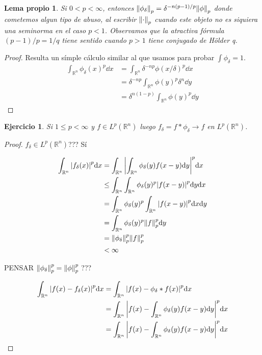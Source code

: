 \documentclass{article}
\newcommand{\realNumbers}{\mathbb{R}}
\newtheorem{exercise}{Ejercicio}
\newtheorem{myLemma}{Lema propio}
\theoremstyle{remark}
\begin{document}
\begin{myLemma}
  Si \(0 < p < \infty\), entonces \(\norm{\phi_{\delta}}_p = \delta^{- n (p - 1) / p} \norm{\phi}_p\) donde cometemos algun tipo de abuso, al escribir \(\norm{\cdot}_p\) cuando este objeto no es siquiera una seminorma en el caso \(p < 1\).
  Observamos que la atractiva fórmula \((p - 1) / p = 1 / q\) tiene sentido cuando \(p > 1\) tiene conjugado de Hölder q.
\end{myLemma}
\begin{proof}
  Resulta un símple cálculo similar al que usamos para probar \(\int \phi_{\delta} = 1\).
  \begin{align}
    \int_{\realNumbers^n} \phi_{\delta}(x)^p \dd x
    &=
    \int_{\realNumbers^n} \delta^{- n p} \phi(x / \delta)^p \dd x
    \\
    &=
    \delta^{- n p} \int_{\realNumbers^n} \phi(y)^p \delta^n \dd y
    \\
    &=
    \delta^{n (1 - p)} \int_{\realNumbers^n} \phi(y)^p \dd y
  \end{align}
\end{proof}

\begin{exercise}
  Si \(1 \leq p < \infty\) y \(f \in L^p(\realNumbers^n)\) luego \(f_{\delta} = f * \phi_{\delta} \rightarrow f\) en \(L^p(\realNumbers^n)\).
\end{exercise}
\begin{proof}
  \(f_{\delta} \in L^p(\realNumbers^n)\)??? Sí

  \begin{align}
    \int_{\realNumbers^n} \abs{f_{\delta}(x)}^p \dd x
    &=
    \int_{\realNumbers^n} \abs{\int_{\realNumbers^n} \phi_{\delta}(y) f(x - y) \dd y}^p \dd x
    \\
    &\leq
    \int_{\realNumbers^n} \int_{\realNumbers^n} \phi_{\delta}(y)^p \abs{f(x - y)}^p \dd y \dd x
    \\
    &=
    \int_{\realNumbers^n} \phi_{\delta}(y)^p \int_{\realNumbers^n} \abs{f(x - y)}^p \dd x \dd y
    \\
    &=
    \int_{\realNumbers^n} \phi_{\delta}(y)^p \norm{f}_p^p \dd y
    \\
    &=
    \norm{\phi_{\delta}}_p^p \norm{f}_p^p
    \\
    &<
    \infty
  \end{align}
  
  PENSAR \(\norm{\phi_{\delta}}_p^p = \norm{\phi}_p^p\) ??? 


  \begin{align}
    \int_{\realNumbers^n} \abs{f(x) - f_{\delta}(x)}^p \dd x
    &=
    \int_{\realNumbers^n} \abs{f(x) - \phi_{\delta} * f(x)}^p \dd x
    \\
    &=
    \int_{\realNumbers^n} \abs{f(x) - \int_{\realNumbers^n} \phi_{\delta}(y) f(x - y) \dd y}^p \dd x
    \\
    &=
    \int_{\realNumbers^n} \abs{f(x) - \int_{\realNumbers^n} \phi_{\delta}(y) f(x - y) \dd y}^p \dd x
  \end{align}
\end{proof}
\end{document}
